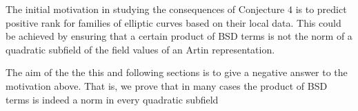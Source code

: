 The initial motivation in studying the consequences of Conjecture $4$ is to predict positive rank for families of elliptic curves based on their local data. This could be achieved by ensuring that a certain product of BSD terms is not the norm of a quadratic subfield of the field values of an Artin representation. 

The aim of the the this and following sections is to give a negative answer to the motivation above. That is, we prove that in many cases the product of BSD terms is indeed a norm in every quadratic subfield 